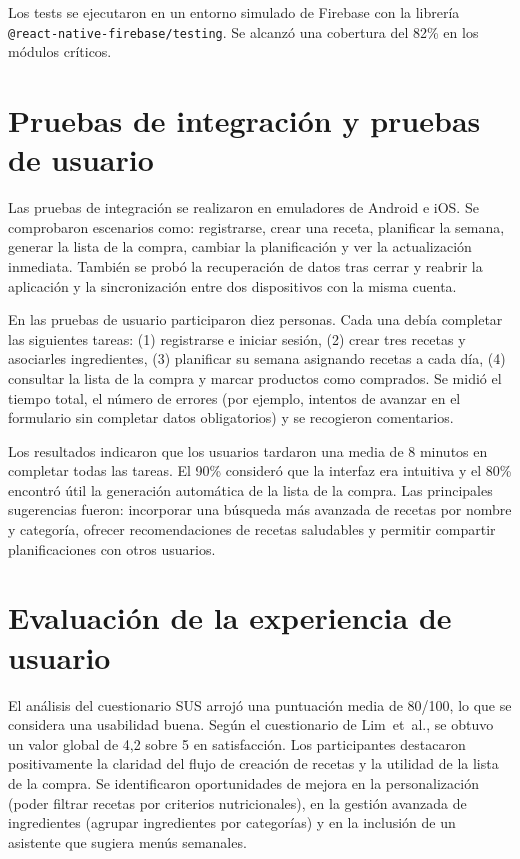 \documentclass[twoside, openright, 11pt]{report}
\begin{document}
Los tests se ejecutaron en un entorno simulado de Firebase con la librería \texttt{@react-native-firebase/testing}. Se alcanzó una cobertura del 82\% en los módulos críticos.

\section{Pruebas de integración y pruebas de usuario}
Las pruebas de integración se realizaron en emuladores de Android e iOS. Se comprobaron escenarios como: registrarse, crear una receta, planificar la semana, generar la lista de la compra, cambiar la planificación y ver la actualización inmediata. También se probó la recuperación de datos tras cerrar y reabrir la aplicación y la sincronización entre dos dispositivos con la misma cuenta.

En las pruebas de usuario participaron diez personas. Cada una debía completar las siguientes tareas: (1) registrarse e iniciar sesión, (2) crear tres recetas y asociarles ingredientes, (3) planificar su semana asignando recetas a cada día, (4) consultar la lista de la compra y marcar productos como comprados. Se midió el tiempo total, el número de errores (por ejemplo, intentos de avanzar en el formulario sin completar datos obligatorios) y se recogieron comentarios.

Los resultados indicaron que los usuarios tardaron una media de 8 minutos en completar todas las tareas. El 90\% consideró que la interfaz era intuitiva y el 80\% encontró útil la generación automática de la lista de la compra. Las principales sugerencias fueron: incorporar una búsqueda más avanzada de recetas por nombre y categoría, ofrecer recomendaciones de recetas saludables y permitir compartir planificaciones con otros usuarios.

\section{Evaluación de la experiencia de usuario}
El análisis del cuestionario SUS arrojó una puntuación media de 80/100, lo que se considera una usabilidad buena. Según el cuestionario de Lim et al., se obtuvo un valor global de 4,2 sobre 5 en satisfacción. Los participantes destacaron positivamente la claridad del flujo de creación de recetas y la utilidad de la lista de la compra. Se identificaron oportunidades de mejora en la personalización (poder filtrar recetas por criterios nutricionales), en la gestión avanzada de ingredientes (agrupar ingredientes por categorías) y en la inclusión de un asistente que sugiera menús semanales.
\end{document}
